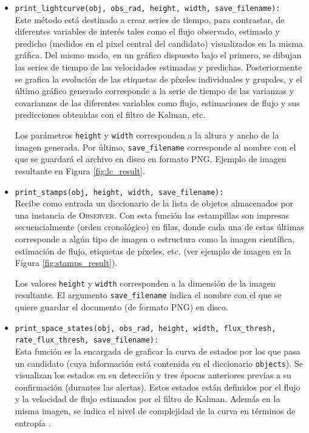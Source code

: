 \begin{itemize}
\item \texttt{print\_lightcurve(obj, obs\_rad, height, width, save\_filename):}\\

Este m\'etodo est\'a destinado a crear series de tiempo, para contrastar, de diferentes variables de inter\'es tales como el flujo observado, estimado y predicho (medidos en el pixel central del candidato) visualizados en la misma gr\'afica. Del mismo modo, en un gr\'afico dispuesto bajo el primero, se dibujan las series de tiempo de las velocidades estimadas y predichas. Posteriormente se grafica la evoluci\'on de las etiquetas de p\'ixeles individuales y grupales, y el \'ultimo gr\'afico generado corresponde a la serie de tiempo de las varianzas y covarianzas de las diferentes variables como flujo, estimaciones de flujo y sus predicciones obtenidas con el filtro de Kalman, etc.
\bigskip

 Los par\'ametros \texttt{height} y \texttt{width} corresponden a la altura y ancho de la imagen generada. Por \'ultimo, \texttt{save\_filename} corresponde al nombre con el que se guardar\'a el archivo en disco en formato PNG. Ejemplo de imagen resultante en Figura \ref{fig:lc_result}.
 
\item \texttt{print\_stamps(obj, height, width, save\_filename):}\\
Recibe como entrada un diccionario de la lista de objetos almacenados por una instancia de \textsc{Observer}. Con esta funci\'on las estampillas son impresas secuencialmente (orden cronol\'ogico) en filas, donde cada una de estas \'ultimas corresponde a alg\'un tipo de imagen o estructura como la imagen cient\'ifica, estimaci\'on de flujo, etiquetas de p\'ixeles, etc. (ver ejemplo de imagen en la Figura \ref{fig:stamps_result}).
\bigskip

Los valores \texttt{height} y \texttt{width} corresponden a la dimensi\'on de la imagen resultante. El argumento \texttt{save\_filename} indica el nombre con el que se quiere guardar el documento (de formato PNG) en disco. 

\item \texttt{print\_space\_states(obj, obs\_rad, height, width, flux\_thresh, rate\_flux\_thresh, save\_filename):}\\
Esta funci\'on es la encargada de graficar la curva de estados por los que pasa un candidato (cuya informaci\'on est\'a contenida en el diccionario \texttt{objects}). Se visualizan los estados en su detecci\'on y tres \'epocas anteriores previas a su confirmaci\'on (durantes las alertas). Estos estados est\'an definidos por el flujo y la velocidad de flujo estimados por el filtro de Kalman. Adem\'as en la misma imagen, se indica el nivel de complejidad de la curva en t\'erminos de entrop\'ia \cite{balestrino}.
\bigskip


\end{itemize}
